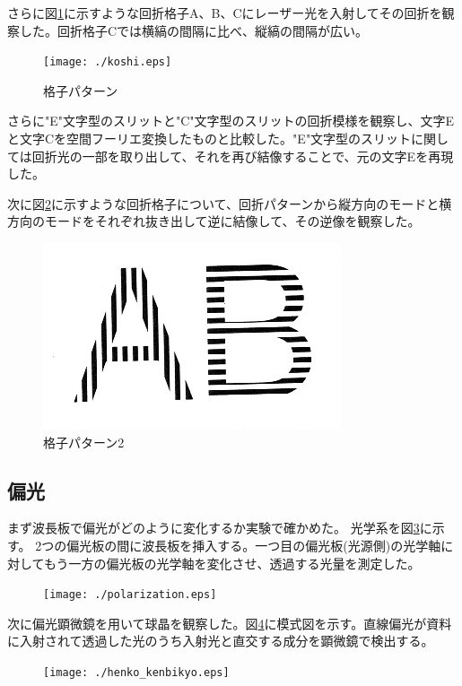 \documentclass[11pt,a4]{jarticle}
\begin{document}
さらに図\ref{fig:koshi}に示すような回折格子A、B、Cにレーザー光を入射してその回折を観察した。回折格子Cでは横縞の間隔に比べ、縦縞の間隔が広い。
\begin{figure}[htbp]
   \begin{center}
    \texttt{[image: ./koshi.eps]}
    \caption{格子パターン}
     \label{fig:koshi}
   \end{center}
\end{figure}

さらに"E"文字型のスリットと"C"文字型のスリットの回折模様を観察し、文字Eと文字Cを空間フーリエ変換したものと比較した。"E"文字型のスリットに関しては回折光の一部を取り出して、それを再び結像することで、元の文字Eを再現した。

次に図\ref{fig:koshi_AB}に示すような回折格子について、回折パターンから縦方向のモードと横方向のモードをそれぞれ抜き出して逆に結像して、その逆像を観察した。
\begin{figure}[htbp]
   \begin{center}
    \includegraphics[width=0.4\hsize]{./koshi_AB.eps}
    \caption{格子パターン2}
     \label{fig:koshi_AB}
   \end{center}
\end{figure}


\subsection{偏光}
まず波長板で偏光がどのように変化するか実験で確かめた。
光学系を図\ref{fig:polarization}に示す。
2つの偏光板の間に波長板を挿入する。一つ目の偏光板(光源側)の光学軸に対してもう一方の偏光板の光学軸を変化させ、透過する光量を測定した。
\begin{figure}[htbp]
   \begin{center}
    \texttt{[image: ./polarization.eps]}
    \caption{}
     \label{fig:polarization}
   \end{center}
\end{figure}

次に偏光顕微鏡を用いて球晶を観察した。図\ref{fig:henko_kenbikyo}に模式図を示す。直線偏光が資料に入射されて透過した光のうち入射光と直交する成分を顕微鏡で検出する。
\begin{figure}[htbp]
   \begin{center}
    \texttt{[image: ./henko\_kenbikyo.eps]}
    \caption{}
     \label{fig:henko_kenbikyo}
   \end{center}
\end{figure}
\end{document}
